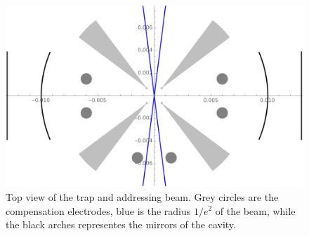 \begin{figure}
     \centering

     \includegraphics[width=.8\textwidth]{img/clipping}
     \caption{Top view of the trap and addressing beam. Grey circles are the compensation electrodes, blue is the radius $1/e^2$ of the beam, while the black arches representes the mirrors of the cavity.}
     \label{clippingtop}
     \end{figure}



